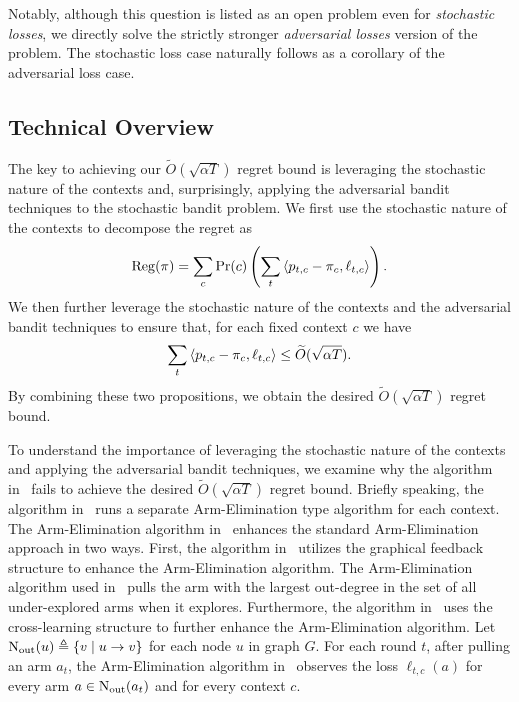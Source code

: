 Notably, although this question is listed as an open problem even for \textit{stochastic losses}, we directly solve the strictly stronger \textit{adversarial losses} version of the problem. The stochastic loss case naturally follows as a corollary of the adversarial loss case. 


\subsection{Technical Overview}

The key to achieving our $\widetilde{O}(\sqrt{\alpha T})$ regret bound is leveraging the stochastic nature of the contexts and,
%
surprisingly, applying the adversarial bandit techniques to the stochastic bandit problem.
%
We first use the stochastic nature of the contexts to decompose the regret as
\[\operatorname{\mathrm{Reg}}(\pi) = \sum_c \Pr(c) \left( \sum_{t} \left\langle p_{t,c} - \pi_c, \ell_{t,c} \right\rangle \right).\]
%
We then further leverage the stochastic nature of the contexts and the adversarial bandit techniques to ensure that, for each fixed context $c$ we have
%
\[\sum_{t} \left\langle p_{t,c} - \pi_c, \ell_{t,c} \right\rangle \le \widetilde{O}(\sqrt{\alpha T}).\]
%
By combining these two propositions, we obtain the desired  $\widetilde{O}(\sqrt{\alpha T})$ regret bound.

To understand the importance of leveraging the stochastic nature of the contexts and applying the adversarial bandit techniques,
%
we examine why the algorithm in~\citet{Han24} fails to achieve the desired $\widetilde{O}(\sqrt{\alpha T})$ regret bound.
%
Briefly speaking, the algorithm in~\citet{Han24} runs a separate Arm-Elimination type algorithm for each context.
%
The Arm-Elimination algorithm in~\citet{Han24} enhances the standard Arm-Elimination approach in two ways.
%
First, the algorithm in~\citet{Han24} utilizes the graphical feedback structure to enhance the Arm-Elimination algorithm.%
%
The Arm-Elimination algorithm used in~\citet{Han24} pulls the arm with the largest out-degree in the set of all under-explored arms when it explores.
%
Furthermore, the algorithm in~\citet{Han24} uses the cross-learning structure to further enhance the Arm-Elimination algorithm.
%
Let $\operatorname{N_{\text{out}}}(u) \triangleq \{ v \mid u \rightarrow v\}$ for each node $u$ in graph $G$.
%
For each round $t$, after pulling an arm $a_t$, the Arm-Elimination algorithm in~\citet{Han24} observes the loss $\ell_{t,c}(a)$ for every arm $a \in \operatorname{N_{\text{out}}}(a_t)$ and for every context $c$.

